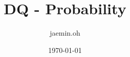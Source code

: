 \documentclass{oblivoir}
\date{\today}
\begin{document}
\author{jaemin.oh}
\title{DQ - Probability}

\maketitle

\end{document}
